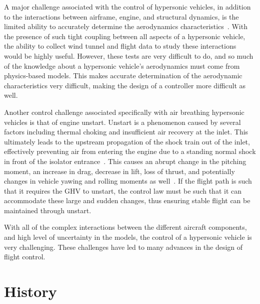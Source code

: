 A major challenge associated with the control of hypersonic vehicles, in addition to the interactions between airframe, engine, and structural dynamics, is the limited ability to accurately determine the aerodynamics characteristics\ \cite{maughmer.prediction.1989,schmidt.dynamics.1991,chavez.analytical.1994,coleman.hypersonic.2009}.
With the presence of such tight coupling between all aspects of a hypersonic vehicle, the ability to collect wind tunnel and flight data to study these interactions would be highly useful.
However, these tests are very difficult to do, and so much of the knowledge about a hypersonic vehicle's aerodynamics must come from physics-based models.
This makes accurate determination of the aerodynamic characteristics very difficult, making the design of a controller more difficult as well.

Another control challenge associated specifically with air breathing hypersonic vehicles is that of engine unstart.
Unstart is a phenomenon caused by several factors including thermal choking and insufficient air recovery at the inlet.
This ultimately leads to the upstream propagation of the shock train out of the inlet, effectively preventing air from entering the engine due to a standing normal shock in front of the isolator entrance\ \cite{curran.scramjet.2000}.
This causes an abrupt change in the pitching moment, an increase in drag, decrease in lift, loss of thrust, and potentially changes in vehicle yawing and rolling moments as well\ \cite{bolender.unstart.2009}.
If the flight path is such that it requires the GHV to unstart, the control law must be such that it can accommodate these large and sudden changes, thus ensuring stable flight can be maintained through unstart.

With all of the complex interactions between the different aircraft components, and high level of uncertainty in the models, the control of a hypersonic vehicle is very challenging.
These challenges have led to many advances in the design of flight control.

\section{History}

